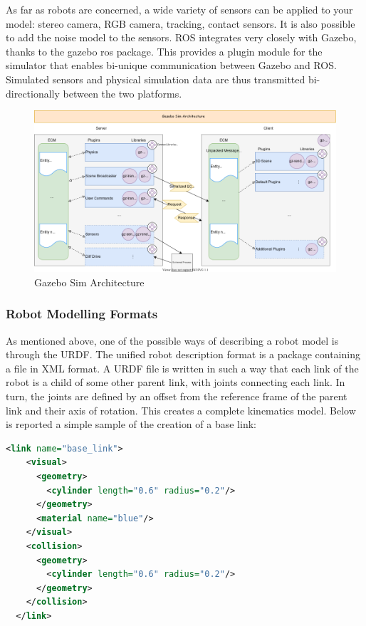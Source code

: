 As far as robots are concerned, a wide variety of sensors can be applied to your model: stereo camera, RGB camera, tracking, contact sensors. It is also possible to add the noise model to the sensors.
ROS integrates very closely with Gazebo, thanks to the gazebo ros package. This provides a plugin module for the simulator that enables bi-unique communication between Gazebo and ROS.
Simulated sensors and physical simulation data are thus transmitted bi-directionally between the two platforms.
 \begin{figure}[H]
     \centering
     \includegraphics[scale=0.40]{Images/Chapter 2/GazeboSimArchitecture.png}
     \caption{Gazebo Sim Architecture}
     \label{fig:gazebosimarch}
 \end{figure}
 
\subsubsection{Robot Modelling Formats}
As mentioned above, one of the possible ways of describing a robot model is through the URDF.
The unified robot description format is a package containing a file in XML format.
A URDF file is written in such a way that each link of the robot is a child of some other parent link, with joints connecting each link. In turn, the joints are defined by an offset from the reference frame of the parent link and their axis of rotation. 
This creates a complete kinematics model. 
Below is reported a simple sample of the creation of a base link:
\begin{lstlisting}[language=XML]
   <link name="base_link">
    <visual>
      <geometry>
        <cylinder length="0.6" radius="0.2"/>
      </geometry>
      <material name="blue"/>
    </visual>
    <collision>
      <geometry>
        <cylinder length="0.6" radius="0.2"/>
      </geometry>
    </collision>
  </link>
\end{lstlisting}

